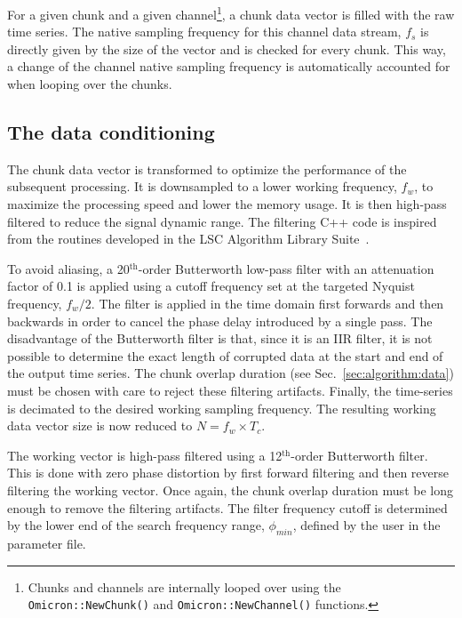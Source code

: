 For a given chunk and a given channel\footnote{Chunks and channels are internally looped over using the \texttt{Omicron::NewChunk()} and \texttt{Omicron::NewChannel()} functions.}, a chunk data vector is filled with the raw time series. The native sampling frequency for this channel data stream, $f_s$ is directly given by the size of the vector and is checked for every chunk.  This way, a change of the channel native sampling frequency is automatically accounted for when looping over the chunks.


\subsection{The data conditioning} \label{sec:algorithm:conditioning}
The chunk data vector is transformed to optimize the performance of the subsequent processing. It is downsampled to a lower working frequency, $f_w$, to maximize the processing speed and lower the memory usage. It is then high-pass filtered to reduce the signal dynamic range. The filtering C++ code is inspired from the routines developed in the LSC Algorithm Library Suite~\cite{LALSUITE}.

To avoid aliasing, a 20$^{\mathrm{th}}$-order Butterworth low-pass filter with an attenuation factor of 0.1 is applied using a cutoff frequency set at the targeted Nyquist frequency, $f_w/2$. The filter is applied in the time domain first forwards and then backwards in order to cancel the phase delay introduced by a single pass. The disadvantage of the Butterworth filter is that, since it is an IIR filter, it is not possible to determine the exact length of corrupted data at the start and end of the output time series. The chunk overlap duration (see Sec.~\ref{sec:algorithm:data}) must be chosen with care to reject these filtering artifacts. Finally, the time-series is decimated to the desired working sampling frequency. The resulting working data vector size is now reduced to $N=f_w \times T_c$.

The working vector is high-pass filtered using a 12$^{\mathrm{th}}$-order Butterworth filter. This is done with zero phase distortion by first forward filtering and then reverse filtering the working vector. Once again, the chunk overlap duration must be long enough to remove the filtering artifacts. The filter frequency cutoff is determined by the lower end of the search frequency range, $\phi_{min}$, defined by the user in the parameter file.

